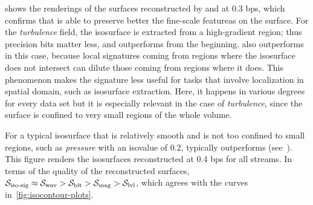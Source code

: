  shows the renderings of the surfaces reconstructed by \sbit
and \swav at 0.3 bps, which confirms that \sbit is able to preserve better the fine-scale featureas
on the surface. For the \emph{turbulence} field, the isosurface is extracted from a high-gradient
region; thus precision bits matter less, and \sbit outperforms \swav from the beginning. \sbit also
outperforms \sisg in this case, because local signatures coming from regions where the isosurface
does not intersect can dilute those coming from regions where it does. This phenomenon makes the
signature less useful for tasks that involve localization in spatial domain, such as isosurface
extraction. Here, it happens in various degrees for every data set but it is especially relevant in
the case of \emph{turbulence}, since the surface is confined to very small regions of the whole
volume.

For a typical isosurface that is relatively smooth and is not too confined to small regions, such as
\emph{pressure} with an isovalue of 0.2, \swav typically outperforms \sbit
(see~). This figure renders the isosurfaces reconstructed at
0.4 bps for all streams. In terms of the quality of the reconstructed surfaces, $\sisg \approx \swav
> \sbit > \smag > \slvl$, which agrees with the curves in~\autoref{fig:isocontour-plots}. 
